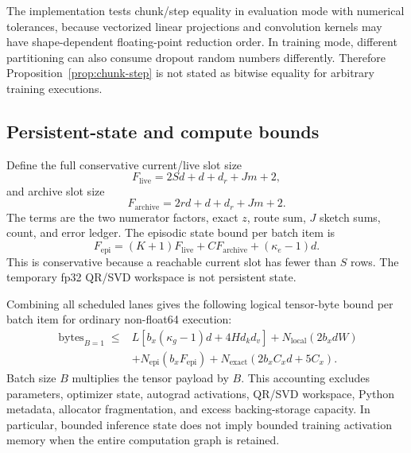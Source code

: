 \begin{remark}
The implementation tests chunk/step equality in evaluation mode with numerical
tolerances, because vectorized linear projections and convolution kernels may
have shape-dependent floating-point reduction order.  In training mode,
different partitioning can also consume dropout random numbers differently.
Therefore Proposition~\ref{prop:chunk-step} is not stated as bitwise equality
for arbitrary training executions.
\end{remark}

\subsection{Persistent-state and compute bounds}
\label{subsec:state-compute}

Define the full conservative current/live slot size
\begin{equation}
  F_{\mathrm{live}}
  =
  2Sd+d+d_r+Jm+2,
  \label{eq:live-slot-size}
\end{equation}
and archive slot size
\begin{equation}
  F_{\mathrm{archive}}
  =
  2rd+d+d_r+Jm+2.
  \label{eq:archive-slot-size}
\end{equation}
The terms are the two numerator factors, exact \(z\), route sum, \(J\) sketch
sums, count, and error ledger.  The episodic state bound per batch item is
\begin{equation}
  F_{\mathrm{epi}}
  =
  (K+1)F_{\mathrm{live}}
  +CF_{\mathrm{archive}}
  +(\kappa_e-1)d.
  \label{eq:episodic-state-bound}
\end{equation}
This is conservative because a reachable current slot has fewer than \(S\)
rows.  The temporary fp32 QR/SVD workspace is not persistent state.

Combining all scheduled lanes gives the following logical tensor-byte bound
per batch item for ordinary non-float64 execution:
\begin{align}
  \operatorname{bytes}_{B=1}
  \leq{}&
  L\left[
    b_x(\kappa_g-1)d
    +4Hd_kd_v
  \right]
  +
  N_{\mathrm{local}}(2b_xdW)
  \nonumber\\
  &+
  N_{\mathrm{epi}}(b_xF_{\mathrm{epi}})
  +
  N_{\mathrm{exact}}
  \left(
    2b_xC_xd+5C_x
  \right).
  \label{eq:model-state-byte-bound}
\end{align}
Batch size \(B\) multiplies the tensor payload by \(B\).  This accounting
excludes parameters, optimizer state, autograd activations, QR/SVD workspace,
Python metadata, allocator fragmentation, and excess backing-storage
capacity.  In particular, bounded inference state does not imply bounded
training activation memory when the entire computation graph is retained.


